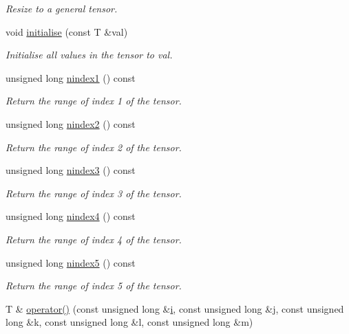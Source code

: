 \begin{DoxyCompactItemize}
\begin{DoxyCompactList}\small\item\em Resize to a general tensor. \end{DoxyCompactList}\item 
void \hyperlink{classoomph_1_1RankFiveTensor_ad3fbc9fc71b68eec0fa4c00d9ad663b6}{initialise} (const T \&val)
\begin{DoxyCompactList}\small\item\em Initialise all values in the tensor to val. \end{DoxyCompactList}\item 
unsigned long \hyperlink{classoomph_1_1RankFiveTensor_ad9f5651447193b2c7e669beff9146cc9}{nindex1} () const
\begin{DoxyCompactList}\small\item\em Return the range of index 1 of the tensor. \end{DoxyCompactList}\item 
unsigned long \hyperlink{classoomph_1_1RankFiveTensor_a92d2a0f9ffc41e75cf5fffa9cfd601fd}{nindex2} () const
\begin{DoxyCompactList}\small\item\em Return the range of index 2 of the tensor. \end{DoxyCompactList}\item 
unsigned long \hyperlink{classoomph_1_1RankFiveTensor_a720c024bccf0b33f2f3bd6367611a4fa}{nindex3} () const
\begin{DoxyCompactList}\small\item\em Return the range of index 3 of the tensor. \end{DoxyCompactList}\item 
unsigned long \hyperlink{classoomph_1_1RankFiveTensor_a2f59dd13534545f9e2641dafee86bc27}{nindex4} () const
\begin{DoxyCompactList}\small\item\em Return the range of index 4 of the tensor. \end{DoxyCompactList}\item 
unsigned long \hyperlink{classoomph_1_1RankFiveTensor_aa880f750e9d2e2bf5ec5c41ad3241568}{nindex5} () const
\begin{DoxyCompactList}\small\item\em Return the range of index 5 of the tensor. \end{DoxyCompactList}\item 
T \& \hyperlink{classoomph_1_1RankFiveTensor_a3b326990dff5d065648c223cf9bcfb5a}{operator()} (const unsigned long \&\hyperlink{cfortran_8h_adb50e893b86b3e55e751a42eab3cba82}{i}, const unsigned long \&j, const unsigned long \&k, const unsigned long \&l, const unsigned long \&m)

\end{DoxyCompactItemize}
